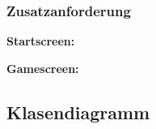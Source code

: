 \documentclass{article}
\begin{document}
\newpage

\subsubsection{Zusatzanforderung}

\textbf{Startscreen:}
\begin{figure}[h]
    \centering
\end{figure}

\textbf{Gamescreen:}
\begin{figure}[h]
    \centering
\end{figure}

\newpage

\subsection{Klasendiagramm}
\end{document}
